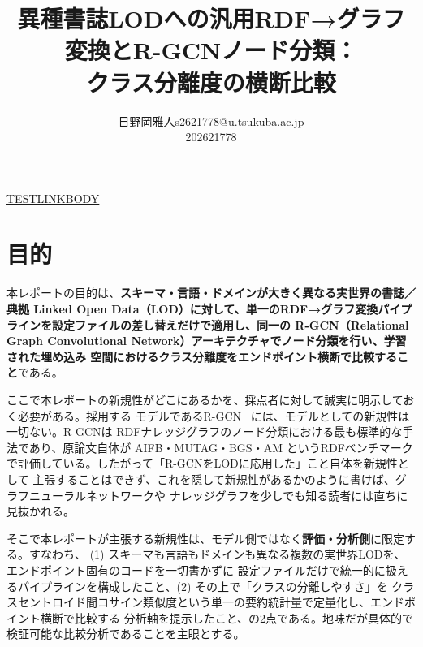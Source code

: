 \documentclass[dvipdfmx,twoside,11pt]{article}
\makeatletter
\newcommand\studentName{日野岡雅人}                  %
\newcommand\studentEmail{s2621778@u.tsukuba.ac.jp}          %
\newcommand\studentNumber{202621778}                %
\newcommand{\repourl}{\href{https://github.com/terasaki-8910/MLPR\_final\_report.git}{{\ttfamily\scriptsize https://github.com/terasaki-8910/MLPR\_final\_report.git}}}
\makeatother
\begin{document}
    \title{異種書誌LODへの汎用RDF→グラフ変換とR-GCNノード分類：\\クラス分離度の横断比較}

    \author{\name \studentName \email \studentEmail \\
    \studentNumber
    \addr
    }


    \maketitle

\makeatletter
\def\@oddfoot{{\repourl}\hfil{\rm\thepage}}%
\def\@evenfoot{{\rm\thepage}\hfil{\repourl}}%
\makeatother


\href{https://example.com/test\_link}{TESTLINKBODY}
\section{目的}
\label{sec:purpose}

本レポートの目的は、\textbf{スキーマ・言語・ドメインが大きく異なる実世界の書誌／典拠 Linked Open
Data（LOD）に対して、単一のRDF→グラフ変換パイプラインを設定ファイルの差し替えだけで適用し、同一の
R-GCN（Relational Graph Convolutional Network）アーキテクチャでノード分類を行い、学習された埋め込み
空間におけるクラス分離度をエンドポイント横断で比較すること}である。

ここで本レポートの新規性がどこにあるかを、採点者に対して誠実に明示しておく必要がある。採用する
モデルであるR-GCN~\citep{schlichtkrull2018modeling} には、モデルとしての新規性は一切ない。R-GCNは
RDFナレッジグラフのノード分類における最も標準的な手法であり、原論文自体が AIFB・MUTAG・BGS・AM
というRDFベンチマークで評価している。したがって「R-GCNをLODに応用した」こと自体を新規性として
主張することはできず、これを隠して新規性があるかのように書けば、グラフニューラルネットワークや
ナレッジグラフを少しでも知る読者には直ちに見抜かれる。

そこで本レポートが主張する新規性は、モデル側ではなく\textbf{評価・分析側}に限定する。すなわち、
(1) スキーマも言語もドメインも異なる複数の実世界LODを、エンドポイント固有のコードを一切書かずに
設定ファイルだけで統一的に扱えるパイプラインを構成したこと、(2) その上で「クラスの分離しやすさ」を
クラスセントロイド間コサイン類似度という単一の要約統計量で定量化し、エンドポイント横断で比較する
分析軸を提示したこと、の2点である。地味だが具体的で検証可能な比較分析であることを主眼とする。
\end{document}
